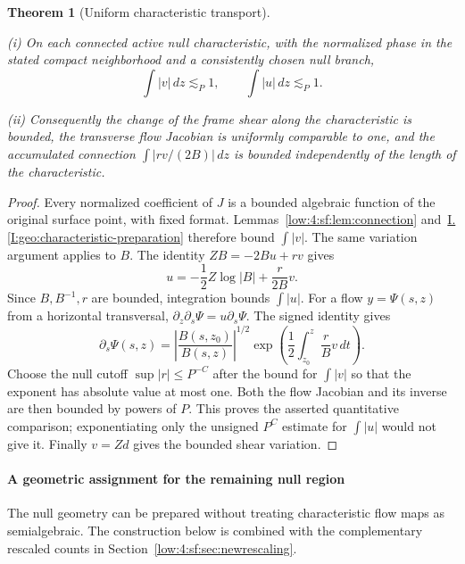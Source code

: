 \documentclass[11pt]{amsart}
\newtheorem{theorem}{Theorem}[section]
\theoremstyle{definition}
\theoremstyle{remark}
\numberwithin{equation}{section}
\newcommand{\partIref}[1]{\hyperref[I:#1]{I.\ref*{I:#1}}}
\begin{document}
\begin{theorem}[Uniform characteristic transport]\label{low:4:sf:thm:transport}

\noindent\textup{(i)} On each connected active null characteristic, with the normalized phase in the stated compact neighborhood and a consistently chosen null branch,
\[
\int |v|\,dz\lesssim_P1,\qquad
\int |u|\,dz\lesssim_P1.
\]

\noindent\textup{(ii)} Consequently the change of the frame shear along the characteristic is bounded, the transverse flow Jacobian is uniformly comparable to one, and the accumulated connection $\int |rv/(2B)|\,dz$ is bounded independently of the length of the characteristic.
\end{theorem}
\begin{proof}
Every normalized coefficient of $J$ is a bounded algebraic function of the original surface point, with fixed format. Lemmas~\ref{low:4:sf:lem:connection} and~\partIref{geo:characteristic-preparation} therefore bound $\int|v|$. The same variation argument applies to $B$. The identity $ZB=-2Bu+rv$ gives
\[
u=-\frac12 Z\log|B|+\frac r{2B}v.
\]
Since $B,B^{-1},r$ are bounded, integration bounds $\int|u|$. For a flow $y=\Psi(s,z)$ from a horizontal transversal, $\partial_z\partial_s\Psi=u\partial_s\Psi$. The signed identity gives
\[
 \partial_s\Psi(s,z)=\left|\frac{B(s,z_0)}{B(s,z)}\right|^{1/2}\exp\left(\frac12\int_{z_0}^z\frac rBv\,dt\right).
\]
Choose the null cutoff $\sup|r|\le P^{-C}$ after the bound for $\int|v|$ so that the exponent has absolute value at most one. Both the flow Jacobian and its inverse are then bounded by powers of $P$. This proves the asserted quantitative comparison; exponentiating only the unsigned $P^C$ estimate for $\int|u|$ would not give it. Finally $v=Zd$ gives the bounded shear variation.
\end{proof}

\paragraph{A geometric assignment for the remaining null region}
The null geometry can be prepared without treating characteristic flow maps as semialgebraic. The construction below is combined with the complementary rescaled counts in Section~\ref{low:4:sf:sec:newrescaling}.
\end{document}
